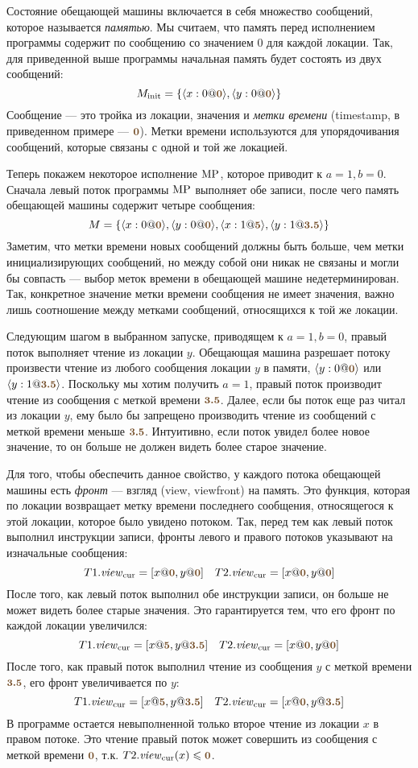 Состояние обещающей машины включается в себя множество сообщений, которое называется 
\emph{памятью}. Мы считаем, что память перед исполнением программы содержит по сообщению
со значением 0 для каждой локации.
Так, для приведенной выше программы начальная память будет состоять из двух сообщений:
\[
M_{\rm init} = \{\angled{x:0@\tstamp{0}}, \angled{y:0@\tstamp{0}}\}
\]
Сообщение --- это тройка из локации, значения и \emph{метки времени} (timestamp,
в приведенном примере --- $\tstamp{0}$). Метки времени используются для упорядочивания
сообщений, которые связаны с одной и той же локацией.

Теперь покажем некоторое исполнение ${\rm MP}$, которое приводит к $a = 1, b = 0$.
Сначала левый поток программы ${\rm MP}$ выполняет обе записи, после чего
память обещающей машины содержит четыре сообщения:
\[
M = \{\angled{x:0@\tstamp{0}}, \angled{y:0@\tstamp{0}}, \angled{x:1@\tstamp{5}}, \angled{y:1@\tstamp{3.5}}\}
\]
Заметим, что метки времени новых сообщений должны быть больше, чем метки инициализирующих
сообщений, но между собой они никак не связаны и могли бы совпасть --- выбор меток времени
в обещающей машине недетерминирован. Так, конкретное значение метки времени сообщения не
имеет значения, важно лишь соотношение между метками сообщений, относящихся к той же локации.

Следующим шагом в выбранном запуске, приводящем к $a = 1, b = 0$, правый поток выполняет чтение из локации $y$.
Обещающая машина разрешает потоку произвести чтение из любого сообщения локации $y$ в памяти,
$\angled{y:0@\tstamp{0}}$ или $\angled{y:1@\tstamp{3.5}}$. Поскольку мы хотим
получить $a = 1$, правый поток производит чтение из сообщения с меткой времени $\tstamp{3.5}$.
Далее, если бы поток еще раз читал из локации $y$, ему было бы запрещено производить
чтение из сообщений с меткой времени меньше $\tstamp{3.5}$.
Интуитивно, если поток увидел более новое значение, то он больше не должен видеть более старое значение.

Для того, чтобы обеспечить данное свойство, у каждого потока обещающей машины есть
\emph{фронт} --- взгляд (view, viewfront) на память. Это функция, которая по локации возвращает
метку времени последнего сообщения, относящегося к этой локации, которое было увидено потоком.
Так, перед тем как левый поток выполнил инструкции записи, фронты левого и правого потоков
указывают на изначальные сообщения:
\[
T1.\Rcur = [x@\tstamp{0}, y@\tstamp{0}] \quad T2.\Rcur = [x@\tstamp{0}, y@\tstamp{0}]
\]
После того, как левый поток выполнил обе инструкции записи, он больше не может видеть
более старые значения. Это гарантируется тем, что его фронт по каждой локации увеличился:
\[
T1.\Rcur = [x@\tstamp{5}, y@\tstamp{3.5}] \quad T2.\Rcur = [x@\tstamp{0}, y@\tstamp{0}]
\]
После того, как правый поток выполнил чтение из сообщения $y$ с меткой времени $\tstamp{3.5}$,
его фронт увеличивается по $y$:
\[
T1.\Rcur = [x@\tstamp{5}, y@\tstamp{3.5}] \quad T2.\Rcur = [x@\tstamp{0}, y@\tstamp{3.5}]
\]
В программе остается невыполненной только второе чтение из локации $x$ в правом потоке.
Это чтение правый поток может совершить из сообщения с меткой времени $\tstamp{0}$, т.к. $T2.\Rcur(x) \le \tstamp{0}$.

